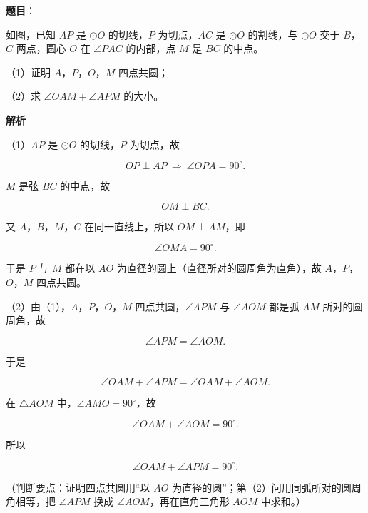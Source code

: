 \begin{answer}

\textbf{题目}：

如图，已知 $AP$ 是 $\odot O$ 的切线，$P$ 为切点，$AC$ 是 $\odot O$ 的割线，与 $\odot O$ 交于 $B$，$C$ 两点，圆心 $O$ 在 $\angle PAC$ 的内部，点 $M$ 是 $BC$ 的中点。

（1）证明 $A$，$P$，$O$，$M$ 四点共圆；

（2）求 $\angle OAM+\angle APM$ 的大小。
\nopagebreak[4]
\begin{center}\end{center}
\nopagebreak[4]
\textbf{解析}

（1）$AP$ 是 $\odot O$ 的切线，$P$ 为切点，故

\nopagebreak[4]
\[OP\perp AP\ \Rightarrow\ \angle OPA=90^\circ.\]

$M$ 是弦 $BC$ 的中点，故

\nopagebreak[4]
\[OM\perp BC.\]

又 $A$，$B$，$M$，$C$ 在同一直线上，所以 $OM\perp AM$，即

\nopagebreak[4]
\[\angle OMA=90^\circ.\]

于是 $P$ 与 $M$ 都在以 $AO$ 为直径的圆上（直径所对的圆周角为直角），故 $A$，$P$，$O$，$M$ 四点共圆。

（2）由（1），$A$，$P$，$O$，$M$ 四点共圆，$\angle APM$ 与 $\angle AOM$ 都是弧 $AM$ 所对的圆周角，故

\nopagebreak[4]
\[\angle APM=\angle AOM.\]

于是

\nopagebreak[4]
\[\angle OAM+\angle APM=\angle OAM+\angle AOM.\]

在 $\triangle AOM$ 中，$\angle AMO=90^\circ$，故

\nopagebreak[4]
\[\angle OAM+\angle AOM=90^\circ.\]

所以

\nopagebreak[4]
\[\angle OAM+\angle APM=90^\circ.\]

（判断要点：证明四点共圆用“以 $AO$ 为直径的圆”；第（2）问用同弧所对的圆周角相等，把 $\angle APM$ 换成 $\angle AOM$，再在直角三角形 $AOM$ 中求和。）


\end{answer}
